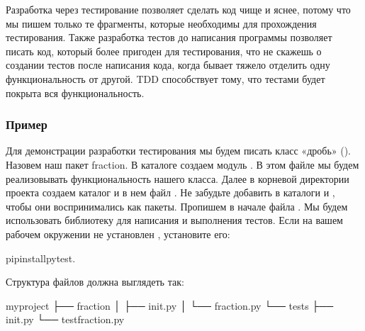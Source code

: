 \documentclass[letterpaper,10pt,russian]{sphinxmanual}
\begin{document}
\sphinxAtStartPar
Разработка через тестирование позволяет сделать код чище и яснее, потому что мы пишем только те фрагменты, которые необходимы для прохождения тестирования. Также разработка тестов до написания программы позволяет писать код, который более пригоден для тестирования, что не скажешь о создании тестов после написания кода, когда бывает тяжело отделить одну функциональность от другой. TDD способствует тому, что тестами будет покрыта вся функциональность.


\subsubsection{Пример}
\label{\detokenize{educational_materials/testing/content:id10}}
\sphinxAtStartPar
Для демонстрации разработки тестирования мы будем писать класс «дробь» (). Назовем наш пакет fraction. В каталоге  создаем модуль . В этом файле мы будем реализовывать функциональность нашего класса. Далее в корневой директории проекта создаем каталог  и в нем файл . Не забудьте добавить  в каталоги  и , чтобы они воспринимались как пакеты.  Пропишем в начале файла . Мы будем использовать библиотеку  для написания и выполнения тестов. Если на вашем рабочем окружении не установлен , установите его:

\begin{sphinxVerbatim}[commandchars=\\\{\}]
pipinstallpytest.
\end{sphinxVerbatim}

\sphinxAtStartPar
Структура файлов должна выглядеть так:

\begin{sphinxVerbatim}[commandchars=\\\{\}]
my\PYGZus{}project
├── fraction
│   ├── \PYGZus{}\PYGZus{}init\PYGZus{}\PYGZus{}.py
│   └── fraction.py
└── tests
    ├── \PYGZus{}\PYGZus{}init\PYGZus{}\PYGZus{}.py
    └── test\PYGZus{}fraction.py
\end{sphinxVerbatim}
\end{document}
